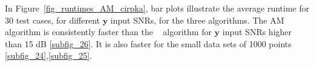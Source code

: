 \documentclass[]{elsarticle} %
\begin{document}
In Figure~\ref{fig_runtimes_AM_cirpka}, bar plots  illustrate the average runtime for 30 test cases, for different $\textbf{y}$ input SNRs, for the three algorithms.
The AM algorithm is consistently faster than the ~\cite{Z_Hydro_Cirpka2007} algorithm for $\textbf{y}$ input SNRs higher than 15 dB \ref{subfig_26}. It is also faster for the small data sets of 1000 points \ref{subfig_24},\ref{subfig_25}.
\\
\begin{figure}[H]
    \centering

\end{figure}
\end{document}

